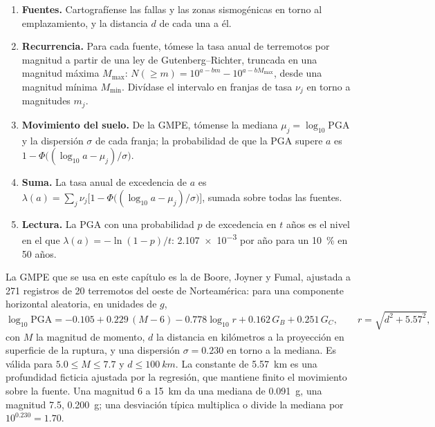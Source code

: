\begin{method}\label{met:b2:geological-hazards:psha}
\begin{enumerate}
  \item \textbf{Fuentes.} Cartografíense las fallas y las zonas sismogénicas en torno al emplazamiento, y la distancia $d$ de
        cada una a él.
  \item \textbf{Recurrencia.} Para cada fuente, tómese la tasa anual de terremotos por magnitud
        a partir de una ley de Gutenberg--Richter, truncada en una magnitud máxima $M_{\max}$:
        $N(\geq m) = 10^{a - bm} - 10^{a - bM_{\max}}$, desde una magnitud mínima $M_{\min}$.
        Divídase el intervalo en franjas de tasa $\nu_j$ en torno a magnitudes $m_j$.
  \item \textbf{Movimiento del suelo.} De la GMPE, tómense la mediana $\mu_j = \log_{10}\mathrm{PGA}$ y
        la dispersión $\sigma$ de cada franja; la probabilidad de que la PGA supere $a$ es
        $1 - \Phi\bigl((\log_{10} a - \mu_j)/\sigma\bigr)$.
  \item \textbf{Suma.} La tasa anual de excedencia de $a$ es $\lambda(a) = \sum_j \nu_j
        \bigl[1 - \Phi\bigl((\log_{10} a - \mu_j)/\sigma\bigr)\bigr]$, sumada sobre todas las fuentes.
  \item \textbf{Lectura.} La PGA con una probabilidad $p$ de excedencia en $t$ años es el nivel en el que
        $\lambda(a) = -\ln(1 - p)/t$: \num{2.107e-3} por año para un \qty{10}{\percent} en 50 años.
\end{enumerate}
\end{method}

La GMPE que se usa en este capítulo es la de Boore, Joyner y Fumal, ajustada a 271 registros de 20
terremotos del oeste de Norteamérica: para una componente horizontal aleatoria, en unidades de $g$,
\begin{equation}
\log_{10}\mathrm{PGA} = -0.105 + 0.229\,(M - 6) - 0.778\log_{10} r + 0.162\,G_B + 0.251\,G_C,
\qquad r = \sqrt{d^2 + 5.57^2},
\label{eq:b2:geological-hazards:gmpe}
\end{equation}
con $M$ la magnitud de momento, $d$ la distancia en kilómetros a la proyección en superficie de la
ruptura, y una dispersión $\sigma = 0.230$ en torno a la mediana. Es válida para $5.0 \leq M \leq 7.7$ y $d
\leq \qty{100}{km}$. La constante de \qty{5.57}{km} es una profundidad ficticia ajustada por la regresión,
que mantiene finito el movimiento sobre la fuente. Una magnitud 6 a \qty{15}{km} da una mediana de
\qty{0.091}{g}, una magnitud 7.5, \qty{0.200}{g}; una desviación típica multiplica o divide la
mediana por $10^{0.230} = 1.70$.

